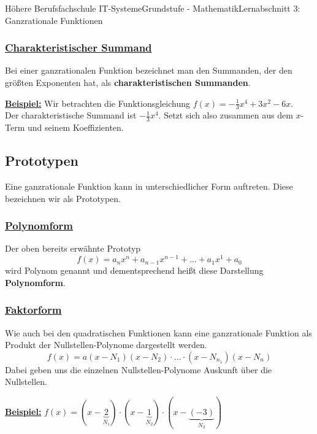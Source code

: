 \documentclass[11pt,twocolumn,oneside,openany,headings=optiontotoc,11pt,numbers=noenddot]{article}
\begin{document}
\begin{worksheet}{Höhere Berufsfachschule IT-Systeme}{Grundstufe - Mathematik}{Lernabschnitt 3: Ganzrationale Funktionen}
		\subsubsection*{\underline{Charakteristischer Summand}}
		Bei einer ganzrationalen Funktion bezeichnet man den Summanden, der den größten Exponenten hat, als \textbf{charakteristischen Summanden}.\\
		\par\noindent
		\underline{\textbf{Beispiel:}} Wir betrachten die Funktionsgleichung \(f(x) = -\frac{1}{3}x^4 + 3x^2 - 6x\).\\
		Der charakteristische Summand ist \colorbox{green!10}{\(-\frac{1}{3}x^4\)}. Setzt sich also zusammen aus dem \(x\)-Term und seinem Koeffizienten.
		\subsection{Prototypen}
		Eine ganzrationale Funktion kann in unterschiedlicher Form auftreten. Diese bezeichnen wir als Prototypen.
		\subsubsection*{\underline{Polynomform}}
		Der oben bereits erwähnte Prototyp \[f(x) = a_nx^n + a_{n-1}x^{n-1} + \ldots + a_1x^1 + a_0\] wird Polynom genannt und dementsprechend heißt diese Darstellung \textbf{Polynomform}.
		\subsubsection*{\underline{Faktorform}}
		Wie auch bei den quadratischen Funktionen kann eine ganzrationale Funktion als Produkt der \grq{}Nullstellen-Polynome\grq{} dargestellt werden.
		\[f(x) = a(x-N_1)(x-N_2)\cdot{}\ldots{}\cdot{}(x-N_{n_1})(x-N_n)\]
		Dabei geben uns die einzelnen \grq{}Nullstellen-Polynome\grq{} Auskunft über die Nullstellen.\\
		\par\noindent
		\underline{\textbf{Beispiel:}} \(f(x) = (x-\underbrace{2}_{N_1})\cdot(x-\underbrace{1}_{N_2})\cdot(x-\underbrace{(-3)}_{N_3})\)

\end{worksheet}
\end{document}
